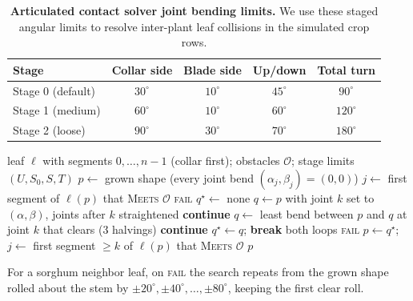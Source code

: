 \documentclass[10pt,twocolumn,letterpaper]{article}
\newcommand{\Meets}{\textsc{Meets}}
\begin{document}
\begin{table}[t!]
  \caption{\textbf{Articulated contact solver joint bending limits.} We use these staged angular limits to resolve inter-plant leaf collisions in the simulated crop rows.}
  \label{tab:supp-stages}\label{tab:supp-solver_limits}
  \centering\scriptsize
  \setlength{\tabcolsep}{3pt}
  \begin{tabular}{lcccc}
  \toprule
  Stage & Collar side & Blade side & Up/down & Total turn \\
  \midrule
  Stage 0 (default) & $30^\circ$ & $10^\circ$ & $45^\circ$ & $90^\circ$ \\
  Stage 1 (medium)  & $60^\circ$ & $10^\circ$ & $60^\circ$ & $120^\circ$ \\
  Stage 2 (loose)   & $90^\circ$ & $30^\circ$ & $70^\circ$ & $180^\circ$ \\
  \bottomrule
  \end{tabular}
\end{table}

\begin{algorithm}[t]
\caption{\textsc{BendClear}: Minimum-deviation collision-free leaf shape}\label{alg:supp-bend}
\footnotesize
\begin{algorithmic}[1]
\Require leaf $\ell$ with segments $0,\dots,n{-}1$ (collar first); obstacles $\mathcal O$; stage limits $(U,S_0,S,T)$
\State $p \gets$ grown shape (every joint bend $(\alpha_j,\beta_j)=(0,0)$)
\State $j \gets$ first segment of $\ell(p)$ that \Meets{} $\mathcal O$ 
   \Return \textsc{fail} \EndIf
  \State $q^\star \gets$ none
   
      \State $q \gets p$ with joint $k$ set to $(\alpha,\beta)$, joints after $k$ straightened
      \If{$\sum_i \|(\alpha_i,\beta_i)\| > T$ \textbf{or} segs.\ $k..j$ of $\ell(q)$ \Meets{} $\mathcal O$}
        \State \textbf{continue}
      \EndIf
      \State $q \gets$ least bend between $p$ and $q$ at joint $k$ that clears (3 halvings)
        \State \textbf{continue}
      \EndIf
      \State $q^\star \gets q$; \textbf{break} both loops
    \EndFor
  \EndFor
   \Return \textsc{fail} \EndIf
  \State $p \gets q^\star$; \quad $j \gets$ first segment $\ge k$ of $\ell(p)$ that \Meets{} $\mathcal O$
\EndWhile
\State \Return $p$
\end{algorithmic}
\noindent\footnotesize For a sorghum neighbor leaf, on \textsc{fail} the search repeats from the grown shape rolled about the stem by $\pm20^\circ,\pm40^\circ,\dots,\pm80^\circ$, keeping the first clear roll.
\end{algorithm}
\end{document}
